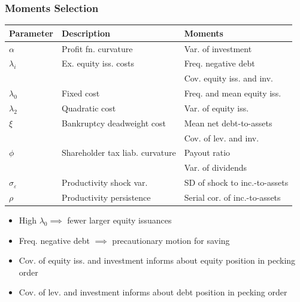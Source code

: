 \documentclass[usenames,dvipsnames, handout]{beamer}
\begin{document}
\begin{frame}
\frametitle{Moments Selection}
\scriptsize
\begin{center}
\begin{tabular}{ lll } 
 \hline
 Parameter            & Description & Moments \\ 
 \hline
 $\alpha$             & Profit fn. curvature  & Var. of investment \\ 
 $\lambda_i$          & Ex. equity iss. costs & Freq. negative debt \\ 
                      &                       &  Cov. equity iss. and inv. \\ 
 $\lambda_0$          & Fixed cost &Freq. and mean equity iss. \\ 
 $\lambda_2$          & Quadratic cost &Var. of equity iss. \\ 
 $\xi$                & Bankruptcy deadweight cost & Mean net debt-to-assets \\
                      &                            & Cov. of lev. and inv.\\
 $\phi$               & Shareholder tax liab. curvature & Payout ratio \\
                      &                                 & Var. of dividends \\
 $\sigma_\varepsilon$ & Productivity shock var. & SD of shock to inc.-to-assets \\
 $\rho$               & Productivity persistence & Serial cor. of inc.-to-assets \\
 \hline 
\end{tabular}
\end{center}
\begin{itemize}
\item High $\lambda_0 \implies$ fewer larger equity issuances
\item Freq. negative debt $\implies$ precautionary motion for saving
\item Cov. of equity iss. and investment informs about equity position in pecking order
\item Cov. of lev. and investment informs about debt position in pecking order 

\end{itemize}
\end{frame}
\end{document}
